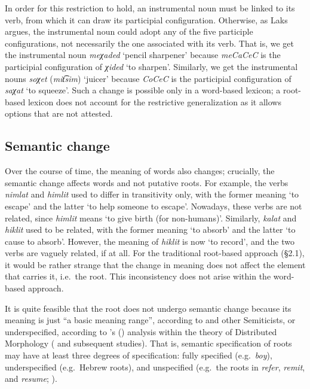 \documentclass[output=paper,
modfonts
]{LSP/langsci}
\begin{document}
In order for this restriction to hold, an instrumental noun must be
linked to its verb, from which it can draw its participial
configuration. Otherwise, as Laks argues, the instrumental noun could
adopt any of the five participle configurations, not necessarily the one
associated with its verb. That is, we get the instrumental noun
\emph{meχaded} `pencil sharpener' because \emph{meCaCeC} is the
participial configuration of \emph{χided} `to sharpen'. Similarly, we
get the instrumental nouns \emph{soχet} (\emph{mit͡sim}) `juicer' because
\emph{CoCeC} is the participial configuration of \emph{saχat} `to
squeeze'. Such a change is possible only in a word-based lexicon; a
root-based lexicon does not account for the restrictive generalization
as it allows options that are not attested.

\subsection{Semantic change}\label{semantic-change}

Over the course of time, the meaning of words also changes; crucially,
the semantic change affects words and not putative roots. For example,
the verbs \emph{nimlat} and \emph{himlit} used to differ in transitivity
only, with the former meaning `to escape' and the latter `to help
someone to escape'. Nowadays, these verbs are not related, since
\emph{himlit} means `to give birth (for non-humans)'. Similarly,
\emph{kalat} and \emph{hiklit} used to be related, with the former
meaning `to absorb' and the latter `to cause to absorb'. However, the
meaning of \emph{hiklit} is now `to record', and the two verbs are
vaguely related, if at all. For the traditional root-based approach
(§2.1), it would be rather strange that the change in meaning does not
affect the element that carries it, i.e.\ the root. This inconsistency
does not arise within the word-based approach.

It is quite feasible that the root does not undergo semantic change
because its meaning is just ``a basic meaning range'', according to
\citet{moscati1980a} and other Semiticists, or underspecified, according to
\citeauthor{arad2005a}'s (\citeyear{arad2005a}) analysis within the theory of Distributed Morphology
(\citealt{halle1993} and subsequent studies). That is, semantic
specification of roots may have at least three degrees of specification:
fully specified (e.g.\ \emph{boy}), underspecified (e.g.\ Hebrew roots),
and unspecified (e.g.\ the roots in \emph{refer}, \emph{remit}, and
\emph{resume}; \citealt{aronoff1976}).
\end{document}
